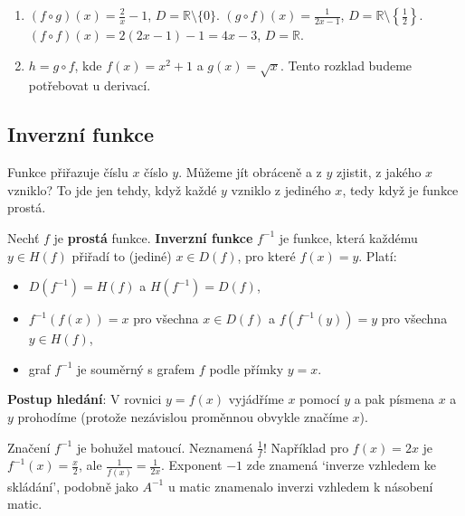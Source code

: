 \begin{solution}
  \begin{enumerate}[label=(\alph*)]
    \item $(f\circ g)(x) = \frac{2}{x} - 1$, $D = \mathbb{R}\setminus\{0\}$. $(g\circ f)(x) = \frac{1}{2x - 1}$, $D = \mathbb{R}\setminus\left\{\frac{1}{2}\right\}$. $(f\circ f)(x) = 2(2x - 1) - 1 = 4x - 3$, $D = \mathbb{R}$.
    \item $h = g\circ f$, kde $f(x) = x^2 + 1$ a $g(x) = \sqrt{x}$. Tento rozklad budeme potřebovat u derivací.
  \end{enumerate}
\end{solution}

\subsection{Inverzní funkce}\label{sec:inverzni-funkce}

Funkce přiřazuje číslu $x$ číslo $y$. Můžeme jít obráceně a z $y$ zjistit, z jakého $x$ vzniklo? To jde jen tehdy, když každé $y$ vzniklo z jediného $x$, tedy když je funkce prostá.

\begin{definitionbox}
  Nechť $f$ je \textbf{prostá} funkce. \textbf{Inverzní funkce} $f^{-1}$ je funkce, která každému $y\in H(f)$ přiřadí to (jediné) $x\in D(f)$, pro které $f(x) = y$. Platí:
  \begin{itemize}
    \item $D(f^{-1}) = H(f)$ a $H(f^{-1}) = D(f)$,
    \item $f^{-1}(f(x)) = x$ pro všechna $x\in D(f)$ a $f(f^{-1}(y)) = y$ pro všechna $y\in H(f)$,
    \item graf $f^{-1}$ je souměrný s grafem $f$ podle přímky $y = x$.
  \end{itemize}

  \textbf{Postup hledání}: V rovnici $y = f(x)$ vyjádříme $x$ pomocí $y$ a pak písmena $x$ a $y$ prohodíme (protože nezávislou proměnnou obvykle značíme $x$).
\end{definitionbox}

\begin{note}
  Značení $f^{-1}$ je bohužel matoucí. Neznamená $\frac{1}{f}$! Například pro $f(x) = 2x$ je $f^{-1}(x) = \frac{x}{2}$, ale $\frac{1}{f(x)} = \frac{1}{2x}$. Exponent $-1$ zde znamená `inverze vzhledem ke skládání', podobně jako $A^{-1}$ u matic znamenalo inverzi vzhledem k násobení matic.
\end{note}

